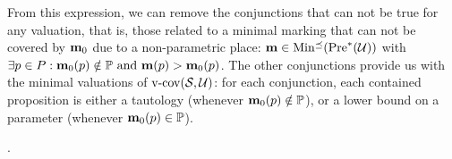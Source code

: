 From this expression, we can remove the conjunctions that can not be true for any valuation, that is, those related to a minimal marking that can not be covered by $\mathbf{m}_0$ due to a non-parametric place: $\mathbf{m} \in \operatorname{Min^\preceq}(\operatorname{Pre}^*_{}(\mathcal{U}))$ with
\(
  \exists p \in P : \mathbf{m}_0(p) \notin \mathbb{P} \text{ and } \mathbf{m}(p) > \mathbf{m}_0(p)
\).
The other conjunctions provide us with the minimal valuations of $\operatorname{v-cov}(\mathcal{S}_{{}},\mathcal{U})$:
for each conjunction, each contained proposition is either a tautology (whenever $\mathbf{m}_0(p) \notin \mathbb{P}$), or a lower bound on a parameter (whenever $\mathbf{m}_0(p) \in \mathbb{P}$).

.

%
%
%
%
%
%

